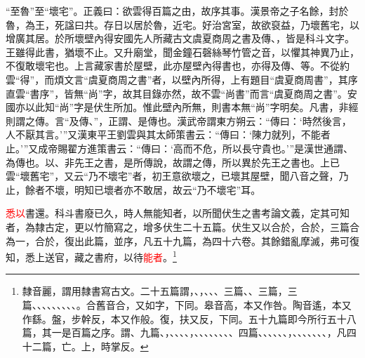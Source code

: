 {\noindent\shu{}\fzkt “至魯”至“壞宅”。正義曰：欲雲得百篇之由，故序其事。漢景帝之子名餘，封於魯，為王，死諡曰共。存日以居於魯，近宅。好治宮室，故欲裒益，乃壞舊宅，以增廣其居。於所壞壁內得安國先人所藏古文虞夏商周之書及傳、，皆是科斗文字。王雖得此書，猶壞不止。又升廟堂，聞金鐘石磬絲琴竹管之音，以懼其神異乃止，不復敢壞宅也。上言藏家書於屋壁，此亦屋壁內得書也，亦得及傳、等。不從約雲“得”，而煩文言“虞夏商周之書”者，以壁內所得，上有題目“虞夏商周書”，其序直雲“書序”，皆無“尚”字，故其目錄亦然，故不雲“尚書”而言“虞夏商周之書”。安國亦以此知“尚”字是伏生所加。惟此壁內所無，則書本無“尚”字明矣。凡書，非經則謂之傳。言“及傳、”，正謂、是傳也。漢武帝謂東方朔云：“傳曰：‘時然後言，人不厭其言。’”又漢東平王劉雲與其太師策書云：“傳曰：‘陳力就列，不能者止。’”又成帝賜翟方進策書云：“傳曰：‘高而不危，所以長守貴也。’”是漢世通謂、為傳也。以、非先王之書，是所傳說，故謂之傳，所以異於先王之書也。上已雲“壞舊宅”，又云“乃不壞宅”者，初王意欲壞之，已壞其屋壁，聞八音之聲，乃止，餘者不壞，明知已壞者亦不敢居，故云“乃不壞宅”耳。 \par}

\textcolor{red}{悉以}書還。科斗書廢已久，時人無能知者，以所聞伏生之書考論文義，定其可知者，為隸古定，更以竹簡寫之，增多伏生二十五篇。伏生又以合於，合於，三篇合為一，合於，復出此篇，並序，凡五十九篇，為四十六卷。其餘錯亂摩滅，弗可復知，悉上送官，藏之書府，以待\textcolor{red}{能者}。\footnote{隸音麗，謂用隸書寫古文。二十五篇謂，、，、、、三篇、、三篇，三篇、、、、、、、、、。合舊音合，又如字，下同。皋音高，本又作咎。陶音遙，本又作繇。盤，步幹反，本又作般。復，扶又反，下同。五十九篇即今所行五十八篇，其一是百篇之序。謂、九篇、，、、、、，、、、、、、、、四篇、、、、、、，、、、、、、、，凡四十二篇，亡。上，時掌反。}

